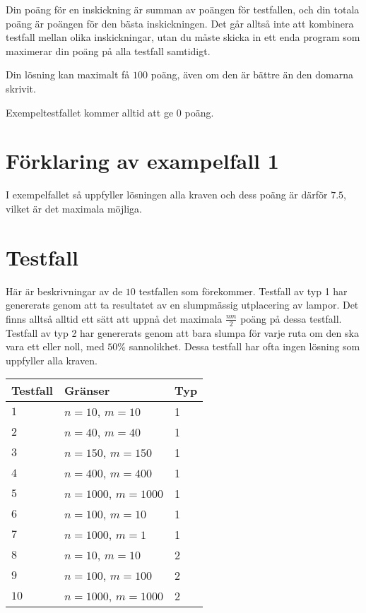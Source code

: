 Din poäng för en inskickning är summan av poängen för testfallen, och din totala poäng är poängen för den bästa inskickningen.
Det går alltså inte att kombinera testfall mellan olika inskickningar, utan du måste skicka in ett enda program som
maximerar din poäng på alla testfall samtidigt.

Din lösning kan maximalt få $100$ poäng, även om den är bättre än den domarna skrivit.

Exempeltestfallet kommer alltid att ge $0$ poäng.


\section*{Förklaring av exampelfall 1}
I exempelfallet så uppfyller lösningen alla kraven och dess poäng är därför $7.5$, vilket är det
maximala möjliga.

\section*{Testfall}
Här är beskrivningar av de $10$ testfallen som förekommer.
Testfall av typ 1 har genererats genom att ta resultatet av en slumpmässig utplacering av lampor.
Det finns alltså alltid ett sätt att uppnå det maximala $\frac{nm}{2}$ poäng på dessa testfall.
Testfall av typ 2 har genererats genom att bara slumpa för varje ruta om den ska vara ett eller noll,
med $50\%$ sannolikhet. Dessa testfall har ofta ingen lösning som uppfyller alla kraven.

\noindent
\begin{tabular}{| l | l | l |}
\hline
\textbf{Testfall} & \textbf{Gränser}                     & \textbf{Typ}  \\ \hline
$1$       & $n = 10$, $m = 10$                           & 1  \\ \hline
$2$       & $n = 40$, $m = 40$                           & 1   \\ \hline
$3$       & $n = 150$, $m = 150$                           & 1   \\ \hline
$4$       & $n = 400$, $m = 400$                          & 1  \\ \hline
$5$       & $n = 1000$, $m = 1000$                          & 1   \\ \hline
$6$       & $n = 100$, $m = 10$                           & 1   \\ \hline
$7$       & $n = 1000$, $m = 1$                           & 1   \\ \hline
$8$       & $n = 10$, $m = 10$                           & 2  \\ \hline
$9$       & $n = 100$, $m = 100$                      & 2   \\ \hline
$10$      & $n = 1000$, $m = 1000$                       & 2   \\ \hline
\end{tabular}
